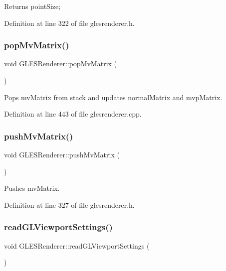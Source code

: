 Returns point\+Size; 

Definition at line 322 of file glesrenderer.\+h.

\mbox{\label{class_g_l_e_s_renderer_a93ddfbce8f107b0cbc41b2854855202d}} 
\subsubsection{\texorpdfstring{popMvMatrix()}{popMvMatrix()}}
{\footnotesize\ttfamily void G\+L\+E\+S\+Renderer\+::pop\+Mv\+Matrix (\begin{DoxyParamCaption}{ }\end{DoxyParamCaption})}

Pops mv\+Matrix from stack and updates normal\+Matrix and mvp\+Matrix. 

Definition at line 443 of file glesrenderer.\+cpp.

\mbox{\label{class_g_l_e_s_renderer_a712dddd10f14f80a003a347ff1aa1666}} 
\subsubsection{\texorpdfstring{pushMvMatrix()}{pushMvMatrix()}}
{\footnotesize\ttfamily void G\+L\+E\+S\+Renderer\+::push\+Mv\+Matrix (\begin{DoxyParamCaption}{ }\end{DoxyParamCaption})\hspace{0.3cm}{\ttfamily [inline]}}

Pushes mv\+Matrix. 

Definition at line 327 of file glesrenderer.\+h.

\mbox{\label{class_g_l_e_s_renderer_aadd9caa2f116226fa3d896bbad437e90}} 
\subsubsection{\texorpdfstring{readGLViewportSettings()}{readGLViewportSettings()}}
{\footnotesize\ttfamily void G\+L\+E\+S\+Renderer\+::read\+G\+L\+Viewport\+Settings (\begin{DoxyParamCaption}{ }\end{DoxyParamCaption})}

